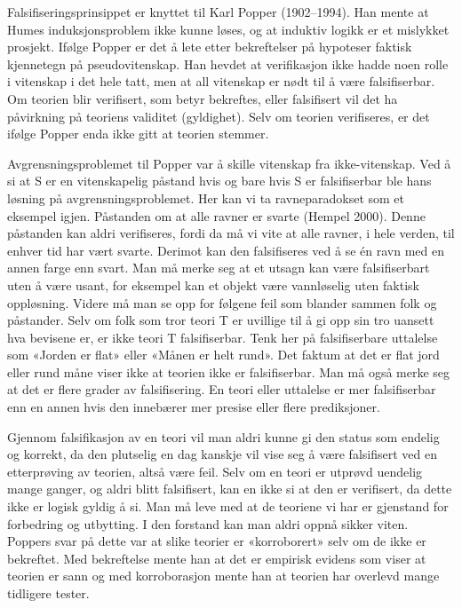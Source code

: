 \documentclass[
  letterpaper,
  DIV=11,
  numbers=noendperiod]{scrreprt}
\begin{document}
Falsifiseringsprinsippet er knyttet til Karl Popper (1902--1994). Han
mente at Humes induksjonsproblem ikke kunne løses, og at induktiv logikk
er et mislykket prosjekt. Ifølge Popper er det å lete etter bekreftelser
på hypoteser faktisk kjennetegn på pseudovitenskap. Han hevdet at
verifikasjon ikke hadde noen rolle i vitenskap i det hele tatt, men at
all vitenskap er nødt til å være falsifiserbar. Om teorien blir
verifisert, som betyr bekreftes, eller falsifisert vil det ha påvirkning
på teoriens validitet (gyldighet). Selv om teorien verifiseres, er det
ifølge Popper enda ikke gitt at teorien stemmer.

Avgrensningsproblemet til Popper var å skille vitenskap fra
ikke-vitenskap. Ved å si at S er en vitenskapelig påstand hvis og bare
hvis S er falsifiserbar ble hans løsning på avgrensningsproblemet. Her
kan vi ta ravneparadokset som et eksempel igjen. Påstanden om at alle
ravner er svarte (Hempel 2000). Denne påstanden kan aldri verifiseres,
fordi da må vi vite at alle ravner, i hele verden, til enhver tid har
vært svarte. Derimot kan den falsifiseres ved å se én ravn med en annen
farge enn svart. Man må merke seg at et utsagn kan være falsifiserbart
uten å være usant, for eksempel kan et objekt være vannløselig uten
faktisk oppløsning. Videre må man se opp for følgene feil som blander
sammen folk og påstander. Selv om folk som tror teori T er uvillige til
å gi opp sin tro uansett hva bevisene er, er ikke teori T falsifiserbar.
Tenk her på falsifiserbare uttalelse som «Jorden er flat» eller «Månen
er helt rund». Det faktum at det er flat jord eller rund måne viser ikke
at teorien ikke er falsifiserbar. Man må også merke seg at det er flere
grader av falsifisering. En teori eller uttalelse er mer falsifiserbar
enn en annen hvis den innebærer mer presise eller flere prediksjoner.

Gjennom falsifikasjon av en teori vil man aldri kunne gi den status som
endelig og korrekt, da den plutselig en dag kanskje vil vise seg å være
falsifisert ved en etterprøving av teorien, altså være feil. Selv om en
teori er utprøvd uendelig mange ganger, og aldri blitt falsifisert, kan
en ikke si at den er verifisert, da dette ikke er logisk gyldig å si.
Man må leve med at de teoriene vi har er gjenstand for forbedring og
utbytting. I den forstand kan man aldri oppnå sikker viten. Poppers svar
på dette var at slike teorier er «korroborert» selv om de ikke er
bekreftet. Med bekreftelse mente han at det er empirisk evidens som
viser at teorien er sann og med korroborasjon mente han at teorien har
overlevd mange tidligere tester.
\end{document}
